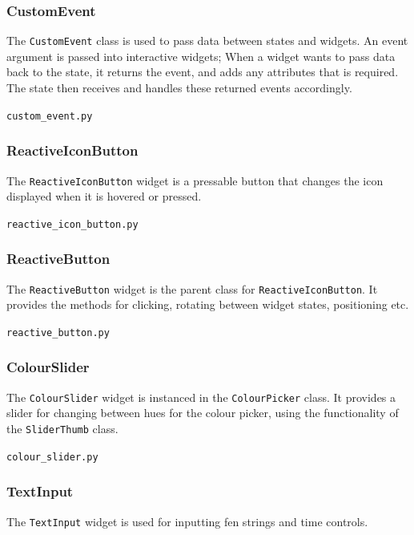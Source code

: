 \documentclass[../main/main.tex]{subfiles}
\begin{document}
\subsubsection*{CustomEvent}
The \lstinline{CustomEvent} class is used to pass data between states and widgets. An event argument is passed into interactive widgets; When a widget wants to pass data back to the state, it returns the event, and adds any attributes that is required. The state then receives and handles these returned events accordingly.

\noindent\verb|custom_event.py|


\subsubsection*{ReactiveIconButton}
\noindent The \lstinline{ReactiveIconButton} widget is a pressable button that changes the icon displayed when it is hovered or pressed.

\noindent\verb|reactive_icon_button.py|


\subsubsection*{ReactiveButton}
\noindent The \lstinline{ReactiveButton} widget is the parent class for \lstinline{ReactiveIconButton}. It provides the methods for clicking, rotating between widget states, positioning etc.

\noindent\verb|reactive_button.py|


\subsubsection*{ColourSlider}
\noindent The \lstinline{ColourSlider} widget is instanced in the \lstinline{ColourPicker} class. It provides a slider for changing between hues for the colour picker, using the functionality of the \lstinline{SliderThumb} class.

\noindent\verb|colour_slider.py|


\subsubsection*{TextInput}
\noindent The \lstinline{TextInput} widget is used for inputting fen strings and time controls.
\end{document}
